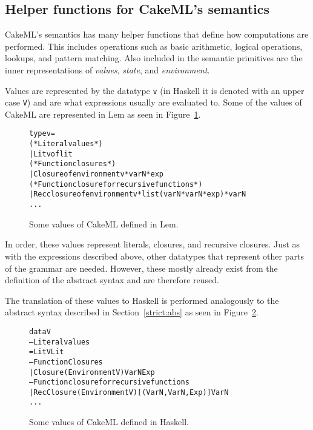 \subsection{Helper functions for CakeML's semantics}
CakeML's semantics has many helper functions that define how computations are
performed. This includes operations such as basic arithmetic, logical
operations, lookups, and pattern matching. Also included in the semantic
primitives are the inner representations of \textit{values}, \textit{state}, and
\textit{environment}.

Values are represented by the datatype \texttt{v} (in Haskell it is denoted with
an upper case \texttt{V}) and are what expressions
usually are evaluated to. Some of the values of CakeML are represented in
Lem as seen in Figure~\ref{fig:vallem}.

\begin{figure}
\begin{alltt}
  type v =
    (* Literal values *)
    | Litv of lit
    (* Function closures *)
    | Closure of environment v * varN * exp
    (* Function closure for recursive functions *)
    | Recclosure of environment v * list (varN * varN * exp) * varN
    ...
\end{alltt}
\caption{Some values of CakeML defined in Lem.}
\label{fig:vallem}
\end{figure}

\noindent In order, these values represent literals, closures, and recursive closures.
Just as with the expressions described above, other datatypes that represent
other parts of the grammar are needed. However, these mostly already exist from
the definition of the abstract syntax and are therefore reused.

The translation of these values to Haskell is performed analogously to the
abstract syntax described in Section~\ref{strict:abs} as seen in
Figure~\ref{fig:valhas}.

\begin{figure}
\begin{alltt}
  data V
    -- Literal values
    = LitV Lit
    -- Function Closures
    | Closure (Environment V) VarN Exp
    -- Function closure for recursive functions
    | RecClosure (Environment V) [(VarN, VarN, Exp)] VarN
    ...
\end{alltt}
\caption{Some values of CakeML defined in Haskell.}
\label{fig:valhas}
\end{figure}

